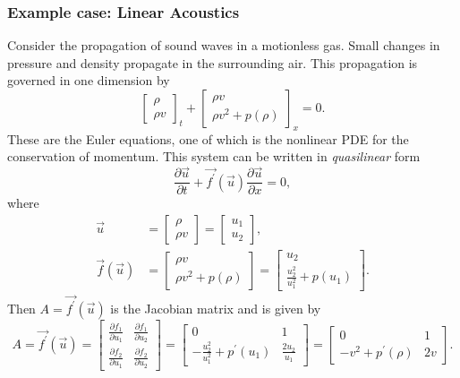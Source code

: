 \subsubsection{Example case: Linear Acoustics}
Consider the propagation of sound waves in a motionless gas. Small changes in pressure and density propagate in the surrounding air. This propagation is governed in one dimension by
\begin{equation}
	\begin{bmatrix}
		\rho \\ \rho v 
	\end{bmatrix}_t
	+
	\begin{bmatrix}
		\rho v \\ \rho v^2 + p(\rho)
	\end{bmatrix}_x
	= 0.
	\label{eq:massmomentum_acoustics}
\end{equation}
These are the Euler equations, one of which is the nonlinear PDE for the conservation of momentum. This system can be written in \textit{quasilinear} form
\begin{equation}
	\frac{\partial \vec u}{\partial t} + \vec {f^\prime}(\vec u) \frac{\partial \vec u}{\partial x} = 0,
\end{equation}
where
\begin{align}
	\vec u &= 
	\begin{bmatrix}
		\rho \\ \rho v
	\end{bmatrix}
	=
	\begin{bmatrix}
		u_1 \\ u_2
	\end{bmatrix},
	\\
	\vec f(\vec u) &= 
	\begin{bmatrix}
		\rho v \\ \rho v^2 + p(\rho)
	\end{bmatrix}
	=
	\begin{bmatrix}
		u_2 \\ \frac{u_2^2}{u_1^2} + p(u_1)
	\end{bmatrix}.
\end{align}
Then $A = \vec {f^\prime} (\vec u)$ is the Jacobian matrix and is given by
\begin{equation}
	A = \vec {f^\prime} (\vec u) =
	\begin{bmatrix}
		\frac{\partial f_1}{\partial u_1} & \frac{\partial f_1}{\partial u_2} \\ 
		\frac{\partial f_2}{\partial u_1} & \frac{\partial f_2}{\partial u_2} 
	\end{bmatrix}
	= 
	\begin{bmatrix}
		0 & 1 \\
		-\frac{u_2^2}{u_1^2} + p^\prime(u_1) & \frac{2 u_2}{u_1}
	\end{bmatrix}
	=
	\begin{bmatrix}
		0 & 1 \\
		-v^2 + p^\prime(\rho) & 2 v
	\end{bmatrix}.
\end{equation}

